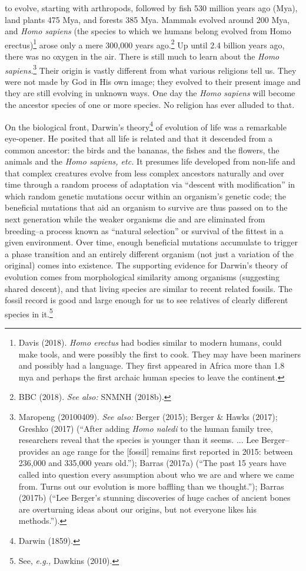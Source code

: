 \begin{multicols}{2}

\noindent
to evolve, starting with arthropods, followed by fish 530 million years ago (Mya), land plants 475 Mya, and forests 385 Mya. Mammals evolved around 200 Mya, and \textit{Homo sapiens} (the species to which we humans belong evolved from Homo erectus)\footnote{Davis (2018). \textit{Homo erectus} had bodies similar to modern humans, could make tools, and were possibly the first to cook. They may have been mariners and possibly had a language. They first appeared in Africa more than 1.8 mya and perhaps the first archaic human species to leave the continent.} arose only a mere 300,000 years ago.\footnote{BBC (2018). \textit{See also:} SNMNH (2018b).} Up until 2.4 billion years ago, there was no oxygen in the air. There is still much to learn about the \textit{Homo sapiens}.\footnote{Maropeng (20100409). \textit{See also:} Berger (2015); Berger \& Hawks (2017); Greshko (2017) (“After adding \textit{Homo naledi} to the human family tree, researchers reveal that the species is younger than it seems. ... Lee Berger--provides an age range for the [fossil] remains first reported in 2015: between 236,000 and 335,000 years old.”); Barras (2017a) (“The past 15 years have called into question every assumption about who we are and where we came from. Turns out our evolution is more baffling than we thought.”); Barras (2017b) (“Lee Berger’s stunning discoveries of huge caches of ancient bones are overturning ideas about our origins, but not everyone likes his methods.”).} Their origin is vastly different from what various religions tell us. They were not made by God in His own image; they evolved to their present image and they are still evolving in unknown ways. One day the \textit{Homo sapiens} will become the ancestor species of one or more species. No religion has ever alluded to that.

On the biological front, Darwin's theory\footnote{Darwin (1859).} of evolution of life was a remarkable eye-opener. He posited that all life is related and that it descended from a common ancestor: the birds and the bananas, the fishes and the flowers, the animals and the \textit{Homo sapiens, etc.} It presumes life developed from non-life and that complex creatures evolve from less complex ancestors naturally and over time through a random process of adaptation via “descent with modification” in which random genetic mutations occur within an organism's genetic code; the beneficial mutations that aid an organism to survive are  thus passed on to the next generation while the weaker organisms die and are eliminated from breeding--a process known as “natural selection” or survival of the fittest in a given environment. Over time, enough beneficial mutations accumulate to trigger a phase transition and an entirely different organism (not just a variation of the original) comes into existence. The supporting evidence for Darwin's theory of evolution comes from morphological similarity among organisms (suggesting shared descent), and that living species are similar to recent related fossils. The fossil record is good and large enough for us to see relatives of clearly different species in it.\footnote{See, \textit{e.g.,} Dawkins (2010).}


\end{multicols}
